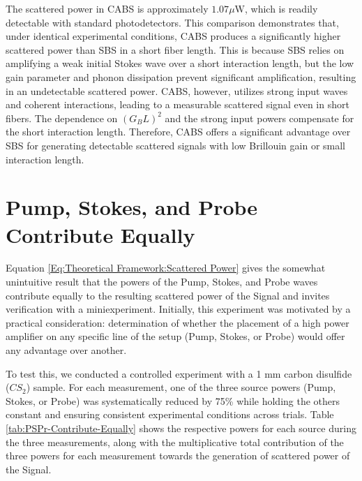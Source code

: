 \documentclass[%
  reprint,
  superscriptaddress,
  amsmath,amssymb,
  aps,
  prapplied,
]{revtex4-2}
\begin{document}
The scattered power in CABS is approximately $1.07 \mu\text{W}$, which is readily detectable with standard photodetectors. This comparison demonstrates that, under identical experimental conditions, CABS produces a significantly higher scattered power than SBS in a short fiber length. This is because SBS relies on amplifying a weak initial Stokes wave over a short interaction length, but the low gain parameter and phonon dissipation prevent significant amplification, resulting in an undetectable scattered power. CABS, however, utilizes strong input waves and coherent interactions, leading to a measurable scattered signal even in short fibers. The dependence on $(G_{B} L)^{2}$ and the strong input powers compensate for the short interaction length. Therefore, CABS offers a significant advantage over SBS for generating detectable scattered signals with low Brillouin gain or small interaction length.


\newpage

\section{Pump, Stokes, and Probe Contribute Equally}

Equation \ref{Eq:Theoretical Framework:Scattered Power} gives the somewhat unintuitive result that the powers of the Pump, Stokes, and Probe waves contribute equally to the resulting scattered power of the Signal and invites verification with a miniexperiment. Initially, this experiment was motivated by a practical consideration: determination of whether the placement of a high power amplifier on any specific line of the setup (Pump, Stokes, or Probe) would offer any advantage over another.

To test this, we conducted a controlled experiment with a 1 mm carbon disulfide ($CS_{2}$) sample. For each measurement, one of the three source powers (Pump, Stokes, or Probe) was systematically reduced by 75\% while holding the others constant and ensuring consistent experimental conditions across trials. Table \ref{tab:PSPr-Contribute-Equally} shows the respective powers for each source during the three measurements, along with the multiplicative total contribution of the three powers for each measurement towards the generation of scattered power of the Signal.
\end{document}
